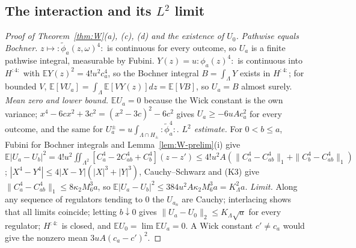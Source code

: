 \documentclass[11pt]{article}
\theoremstyle{plain}
\theoremstyle{definition}
\theoremstyle{remark}
\newcommand{\E}{\mathbb{E}}
\begin{document}
\subsection{The interaction and its \texorpdfstring{$L^{2}$}{L2} limit}

\begin{proof}[Proof of Theorem~\ref{thm:W}(a), (c), (d) and the existence of $U_0$]
\emph{Pathwise equals Bochner.} $z\mapsto{:}\tilde\phi_a(z,\omega)^{4}{:}$ is continuous for every outcome, so
$U_a$ is a finite pathwise integral, measurable by Fubini. $Y(z)=u{:}\phi_a(z)^{4}{:}$ is
continuous into $H^{{:}4{:}}$ with $\E Y(z)^{2}=4!u^{2}c_a^{4}$, so the Bochner integral $B=\int_\Lambda Y$ exists in
$H^{{:}4{:}}$; for bounded $V$, $\E[VU_a]=\int_\Lambda\E[VY(z)]dz=\E[VB]$, so $U_a=B$ almost surely.
\emph{Mean zero and lower bound.} $\E U_a=0$ because the Wick constant is the own
variance; $x^{4}-6cx^{2}+3c^{2}=(x^{2}-3c)^{2}-6c^{2}$ gives $U_a\ge-6uAc_a^{2}$ for every outcome, and the
same for $U^{\pm}_a=u\int_{\Lambda\cap H_\pm}{:}\tilde\phi_a^{4}{:}$. \emph{$L^{2}$ estimate.} For $0<b\le a$, Fubini for Bochner
integrals and Lemma~\ref{lem:W-prelim}(i) give
$\E|U_a-U_b|^{2}=4!u^{2}\iint_{\Lambda^{2}}[C_a^{4}-2C_{ab}^{4}+C_b^{4}](z-z')\le4!u^{2}A(\|C_a^{4}-C_{ab}^{4}\|_1+\|C_b^{4}-C_{ab}^{4}\|_1)$;
$|X^{4}-Y^{4}|\le4|X-Y|(|X|^{3}+|Y|^{3})$, Cauchy--Schwarz and (K3) give
$\|C_a^{4}-C_{ab}^{4}\|_1\le8\kappa_2M_6^{3}a$, so $\E|U_a-U_b|^{2}\le384u^{2}A\kappa_2M_6^{3}a=K_\Lambda^{2}a$.
\emph{Limit.} Along any sequence of regulators tending to $0$ the $U_{a_n}$ are Cauchy;
interlacing shows that all limits coincide; letting $b\downarrow0$ gives $\|U_a-U_0\|_2\le K_\Lambda\sqrt a$
for every regulator; $H^{{:}4{:}}$ is closed, and $\E U_0=\lim\E U_a=0$. A Wick constant $c'\ne c_a$ would
give the nonzero mean $3uA(c_a-c')^{2}$.
\end{proof}
\end{document}
